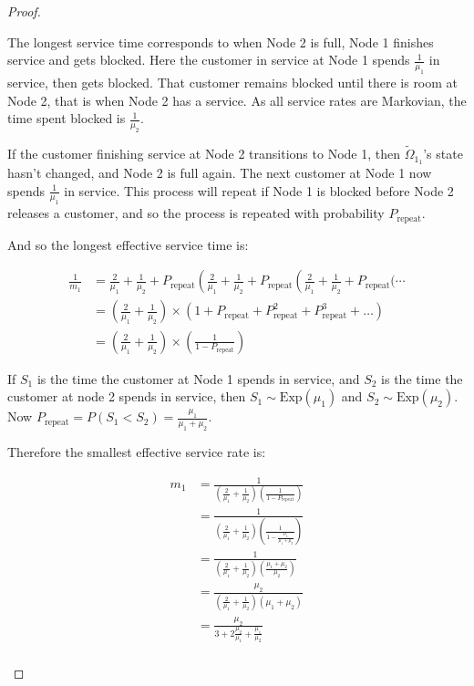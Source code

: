 \documentclass{article}
\begin{document}
\begin{proof}
\begin{enumerate}
The longest service time corresponds to when Node 2 is full, Node 1 finishes service and gets blocked.
Here the customer in service at Node 1 spends $\frac{1}{\mu_1}$ in service, then gets blocked.
That customer remains blocked until there is room at Node 2, that is when Node 2 has a service.
As all service rates are Markovian, the time spent blocked is $\frac{1}{\mu_2}$.

If the customer finishing service at Node 2 transitions to Node 1, then $\widetilde{\Omega}_{1_1}$'s state hasn't changed, and Node 2 is full again.
The next customer at Node 1 now spends $\frac{1}{\mu_1}$ in service.
This process will repeat if Node 1 is blocked before Node 2 releases a customer, and so the process is repeated with probability $P_{\text{repeat}}$.

And so the longest effective service time is:

\begin{align*}
  \frac{1}{m_1} & = \frac{2}{\mu_1} + \frac{1}{\mu_2} + P_{\text{repeat}} \left( \frac{2}{\mu_1} + \frac{1}{\mu_2} + P_{\text{repeat}} \left( \frac{2}{\mu_1} + \frac{1}{\mu_2} + P_{\text{repeat}} \bigg( \dotsi \right. \right. \\
  & = \left( \frac{2}{\mu_1} + \frac{1}{\mu_2} \right) \times \left( 1 + P_{\text{repeat}} + P_{\text{repeat}}^2 + P_{\text{repeat}}^3 + \dots \right) \\
  & = \left( \frac{2}{\mu_1} + \frac{1}{\mu_2} \right) \times \left( \frac{1}{1 - P_{\text{repeat}}} \right)
\end{align*}

If $S_1$ is the time the customer at Node 1 spends in service, and $S_2$ is the time the customer at node 2 spends in service, then $S_1 \sim \text{Exp}(\mu_1)$ and $S_2 \sim \text{Exp}(\mu_2)$.
Now $P_{\text{repeat}} = P(S_1 < S_2) = \frac{\mu_1}{\mu_1 + \mu_2}$.

Therefore the smallest effective service rate is:

\begin{align*}
  m_1 & = \frac{1}{ \left( \frac{2}{\mu_1} + \frac{1}{\mu_2} \right) \left( \frac{1}{1-P_{\text{repeat}}} \right) } \\
  & = \frac{1}{ \left( \frac{2}{\mu_1} + \frac{1}{\mu_2} \right) \left( \frac{1}{1-\frac{\mu_1}{\mu_1 + \mu_2}} \right) } \\
  & = \frac{1}{ \left( \frac{2}{\mu_1} + \frac{1}{\mu_2} \right) \left( \frac{\mu_1 + \mu_2}{\mu_2} \right) } \\
  & = \frac{\mu_2}{ \left( \frac{2}{\mu_1} + \frac{1}{\mu_2} \right) \left( \mu_1 + \mu_2 \right) } \\
  & = \frac{\mu_2}{3 + 2\frac{\mu_2}{\mu_1} + \frac{\mu_1}{\mu_2}} \\
\end{align*}


\end{enumerate}
\end{proof}
\end{document}
